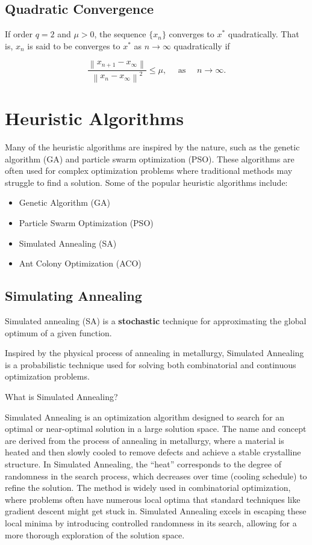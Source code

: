 \documentclass[
  letterpaper,
  DIV=11,
  numbers=noendperiod]{scrreprt}
\providecommand{\tightlist}{%
  \setlength{\itemsep}{0pt}\setlength{\parskip}{0pt}}
\begin{document}
\subsection{Quadratic Convergence}\label{quadratic-convergence}

If order \(q = 2\) and \(\mu > 0\), the sequence \(\{x_n\}\) converges
to \(x^*\) quadratically. That is, \(x_n\) is said to be converges to
\(x^*\) as \(n\to\infty\) quadratically if

\[
\frac{\left\|x_{n+1}-x_{\infty}\right\|}{\left\|x_n-x_{\infty}\right\|^2} \le \mu, \quad \text{ as } \quad n\to\infty.
\]

\section{Heuristic Algorithms}\label{heuristic-algorithms}

Many of the heuristic algorithms are inspired by the nature, such as the
genetic algorithm (GA) and particle swarm optimization (PSO). These
algorithms are often used for complex optimization problems where
traditional methods may struggle to find a solution. Some of the popular
heuristic algorithms include:

\begin{itemize}
\tightlist
\item
  Genetic Algorithm (GA)
\item
  Particle Swarm Optimization (PSO)
\item
  Simulated Annealing (SA)
\item
  Ant Colony Optimization (ACO)
\end{itemize}

\subsection{Simulating Annealing}\label{simulating-annealing}

Simulated annealing (SA) is a \textbf{stochastic} technique for
approximating the global optimum of a given function.

Inspired by the physical process of annealing in metallurgy, Simulated
Annealing is a probabilistic technique used for solving both
combinatorial and continuous optimization problems.

What is Simulated Annealing?

Simulated Annealing is an optimization algorithm designed to search for
an optimal or near-optimal solution in a large solution space. The name
and concept are derived from the process of annealing in metallurgy,
where a material is heated and then slowly cooled to remove defects and
achieve a stable crystalline structure. In Simulated Annealing, the
``heat'' corresponds to the degree of randomness in the search process,
which decreases over time (cooling schedule) to refine the solution. The
method is widely used in combinatorial optimization, where problems
often have numerous local optima that standard techniques like gradient
descent might get stuck in. Simulated Annealing excels in escaping these
local minima by introducing controlled randomness in its search,
allowing for a more thorough exploration of the solution space.
\end{document}
